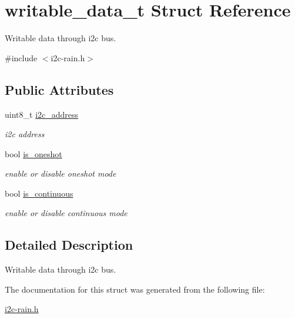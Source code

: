 \hypertarget{structwritable__data__t}{}\section{writable\+\_\+data\+\_\+t Struct Reference}
\label{structwritable__data__t}


Writable data through i2c bus.  




{\ttfamily \#include $<$i2c-\/rain.\+h$>$}

\subsection*{Public Attributes}
\begin{DoxyCompactItemize}
\item 
\mbox{\label{structwritable__data__t_a539304e9f0f30b03691af8b1e8cb6a16}} 
uint8\+\_\+t \hyperlink{structwritable__data__t_a539304e9f0f30b03691af8b1e8cb6a16}{i2c\+\_\+address}
\begin{DoxyCompactList}\small\item\em i2c address \end{DoxyCompactList}\item 
\mbox{\label{structwritable__data__t_afc3c86659df5f3a0840313702c7f66fe}} 
bool \hyperlink{structwritable__data__t_afc3c86659df5f3a0840313702c7f66fe}{is\+\_\+oneshot}
\begin{DoxyCompactList}\small\item\em enable or disable oneshot mode \end{DoxyCompactList}\item 
\mbox{\label{structwritable__data__t_a9c3b7927d969d6f21fe475fd3d67f485}} 
bool \hyperlink{structwritable__data__t_a9c3b7927d969d6f21fe475fd3d67f485}{is\+\_\+continuous}
\begin{DoxyCompactList}\small\item\em enable or disable continuous mode \end{DoxyCompactList}\end{DoxyCompactItemize}


\subsection{Detailed Description}
Writable data through i2c bus. 

The documentation for this struct was generated from the following file\+:\begin{DoxyCompactItemize}
\item 
\hyperlink{i2c-rain_8h}{i2c-\/rain.\+h}\end{DoxyCompactItemize}
